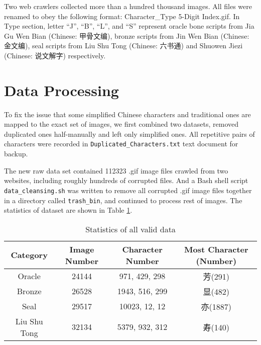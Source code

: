 \begin{CJK*}{UTF8}{gbsn} Two web crawlers collected more than a hundred thousand images. All files were renamed to obey the following format: \textlangle{}Character\textrangle{}\_\textlangle{}Type \textrangle{}\textlangle{}5-Digit Index\textrangle{}.gif. In Type section, letter ``J'', ``B'', ``L'', and ``S'' represent oracle bone scripts from Jia Gu Wen Bian (Chinese: 甲骨文编), bronze scripts from Jin Wen Bian (Chinese: 金文编), seal scripts from Liu Shu Tong (Chinese: 六书通) and Shuowen Jiezi (Chinese: 说文解字) respectively.\end{CJK*}

\section{Data Processing}
To fix the issue that some simplified Chinese characters and traditional ones are mapped to the exact set of images, we first combined two datasets, removed duplicated ones half-manually and left only simplified ones. All repetitive pairs of characters were recorded in \texttt{Duplicated\_Characters.txt} text document for backup.

The new raw data set contained 112323 .gif image files crawled from two websites, including roughly hundreds of corrupted files. And a Bash shell script \texttt{data\_cleansing.sh} was written to remove all corrupted .gif image files together in a directory called \texttt{trash\_bin}, and continued to process rest of images. The statistics of dataset are shown in Table \ref{t:statistics}.
\begin{CJK*}{UTF8}{gbsn}
	\begin{table}[h]
		\centering
		\begin{tabular}{@{}cccc@{}}
			\toprule
			Category     & Image Number & Character Number\footnotemark & Most Character (Number) \\ \midrule
			Oracle       & 24144      & 971, 429, 298   & 芳(291) \\
			Bronze       & 26528      & 1943, 516, 299  & 显(482) \\
			Seal         & 29517      & 10023, 12, 12   & 亦(1887) \\
			Liu Shu Tong & 32134      & 5379, 932, 312  & 寿(140) \\ \bottomrule
		\end{tabular}
		\caption{Statistics of all valid data}
		\label{t:statistics}
	\end{table}
\end{CJK*}

